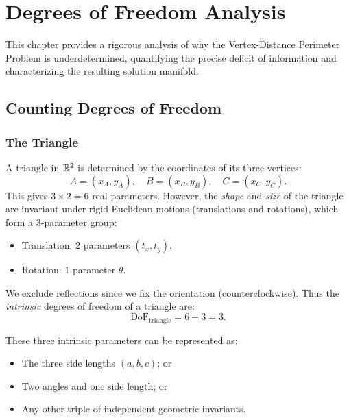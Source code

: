 
\chapter{Degrees of Freedom Analysis}
\label{ch:dof}

This chapter provides a rigorous analysis of why the Vertex-Distance Perimeter Problem is underdetermined, quantifying the precise deficit of information and characterizing the resulting solution manifold.

\section{Counting Degrees of Freedom}

\subsection{The Triangle}

A triangle in $\mathbb{R}^2$ is determined by the coordinates of its three vertices:
\begin{equation}
A = (x_A, y_A), \quad B = (x_B, y_B), \quad C = (x_C, y_C).
\end{equation}
This gives $3 \times 2 = 6$ real parameters. However, the \emph{shape} and \emph{size} of the triangle are invariant under rigid Euclidean motions (translations and rotations), which form a 3-parameter group:
\begin{itemize}
    \item Translation: 2 parameters $(t_x, t_y)$,
    \item Rotation: 1 parameter $\theta$.
\end{itemize}

We exclude reflections since we fix the orientation (counterclockwise). Thus the \emph{intrinsic} degrees of freedom of a triangle are:
\begin{equation}
\text{DoF}_{\text{triangle}} = 6 - 3 = 3.
\end{equation}

These three intrinsic parameters can be represented as:
\begin{itemize}
    \item The three side lengths $(a, b, c)$; or
    \item Two angles and one side length; or
    \item Any other triple of independent geometric invariants.
\end{itemize}

